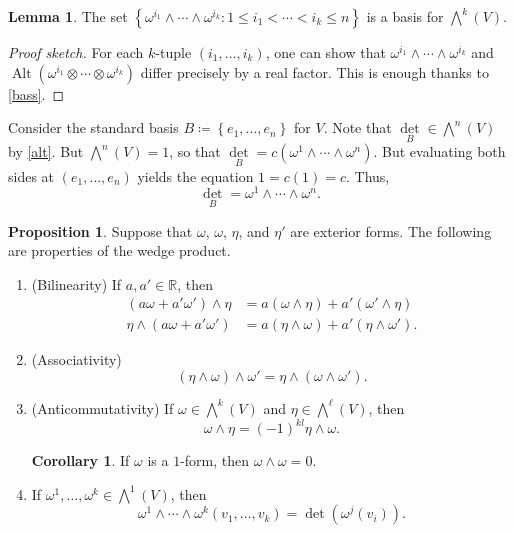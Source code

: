 \documentclass[10pt,letterpaper,cm]{nupset}
\theoremstyle{definition}
\theoremstyle{theorem}
\newtheorem{lemma}[definition]{Lemma}
\newtheorem{prop}[definition]{Proposition}
\newtheorem{corollary}[definition]{Corollary}
\theoremstyle{remark}
\newcommand{\R}{\mathbb R}
\newcommand{\1}{\mathbf{1}}
\newcommand{\0}{\vec 0}
\DeclareMathOperator{\Alt}{Alt}
\begin{document}
\begin{lemma}
The set $\left\{\omega^{i_1} \wedge \cdots \wedge \omega^{i_k}  : 1 \leq i_1 < \cdots < i_k \leq n\right\}$ is a basis for $\bigwedge^k(V)$.
\end{lemma}
\begin{proof}[Proof sketch]
For each $k$-tuple $\left(i_1, \ldots, i_k\right)$, one can show that $\omega^{i_1} \wedge \cdots \wedge \omega^{i_k}$ and $\Alt(\omega^{i_1} \otimes \cdots \otimes \omega^{i_k} )$ differ precisely by a real factor. This is enough thanks to \cref{bass}.
\end{proof}

\smallskip

Consider the standard basis $B \coloneqq   \left\{e_1, \ldots, e_n\right\}$ for $V$. Note that $\underset{B}{\det} \in \bigwedge^n(V)$ by \cref{alt}.
But $\bigwedge^n(V) = 1$, so that $\underset{B}{\det} = c(\omega^1 \wedge \cdots \wedge \omega^n)$. But evaluating both sides at $(e_1, \ldots, e_n)$ yields the equation $1 = c(1) = c$. Thus, $$\underset{B}{\det} = \omega^1 \wedge \cdots \wedge \omega^n.$$

\smallskip

\begin{prop}\label{stuff} Suppose that $\omega$, $\omega$, $\eta$, and $\eta'$ are exterior forms. The following are properties of the wedge product.
\begin{enumerate}[label=(\arabic*)]
\item{(Bilinearity)} If $a, a' \in \R$, then 
\begin{align*}
(a\omega + a'\omega ')\wedge \eta &= a(\omega \wedge \eta) + a'(\omega' \wedge \eta)   \\   \eta \wedge (a\omega + a'\omega ') &= a(\eta \wedge \omega) + a'(\eta \wedge \omega' ). 
\end{align*}
\item{(Associativity)} $$(\eta \wedge \omega) \wedge \omega' =    \eta \wedge (\omega \wedge \omega') .$$
\item{(Anticommutativity)} If $\omega \in \bigwedge^k(V)$ and $\eta \in \bigwedge^{\ell}(V)$, then $$\omega \wedge \eta = \left({-1}\right)^{kl}\eta \wedge \omega.   $$
\begin{corollary}
If $\omega$ is a $1$-form, then $\omega \wedge \omega = 0$.
\end{corollary}
\item If $\omega^1, \ldots, \omega^k \in \bigwedge^1(V)$, then $$ \omega^1 \wedge \cdots \wedge \omega^k(v_1, \ldots, v_k) =\det(\omega^j(v_i)). $$ 
\end{enumerate}
\end{prop}
\end{document}
